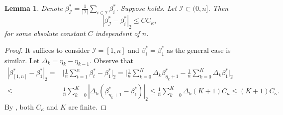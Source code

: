 \documentclass[11pt]{article}
\newcommand{\I}{{\mathcal I }}
\theoremstyle{plain}
\newtheorem{lemma}[theorem]{Lemma}
\theoremstyle{definition}
\begin{document}
\begin{lemma} \label{lemma:beta bounded 1}
Denote $ \beta^*_\I  = \frac{1}{|\I|} \sum_{  i \in \I } \beta^*_i  $. Suppose    holds. Let $\I \subset (0,n] $.  Then 
   $$ |\beta^*_\I - \beta^*_ i |_2    \le CC_\kappa,$$
  for some absolute constant $C$ independent of $n$.
\end{lemma} 
 \begin{proof}
 It suffices to consider $\I =[1,n]$  and  $\beta^*_ i= \beta^*_1 $ as the general case is similar. Let $\Delta_k = \eta_{k}-\eta_{k-1}$. Observe that  
 \begin{align*}
   | \beta^*_{[1,n]}  - \beta_ 1^*   |_2  =& 
  \bigg |  \frac{1}{n} \sum_{t =1}^n \beta_t  ^*  - \beta_1^*  
   \bigg |_2 
 = \bigg |  \frac{1}{n} \sum_{k=0}^{K} \Delta_k \beta_{\eta_k+ 1} ^*   -    \frac{1}{n}\sum_{k=0}^{K} \Delta_k  \beta_1 ^*
  \bigg |_2  
  \\
 \le 
 &    \frac{1}{n} \sum_{k=0}^{K}  | \Delta_k  (\beta_{\eta_k+ 1} ^* -\beta_1 ^* )  |_2    \le 
 \frac{1}{n}\sum_{k=0}^{K} \Delta_k  (K+1)  C_\kappa   \le  (K+1)C_\kappa . 
  \end{align*}
  By , both $C_\kappa  $ and $K   $ are finite.
 \end{proof}
\end{document}

